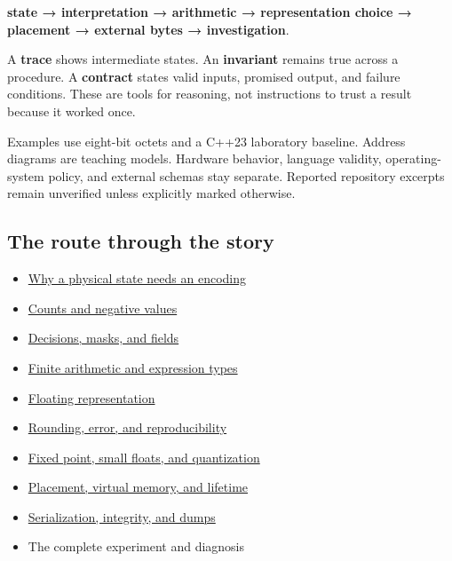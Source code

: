 \textbf{state → interpretation → arithmetic → representation choice → placement → external bytes → investigation}.

A \textbf{trace} shows intermediate states. An \textbf{invariant} remains true across a procedure. A \textbf{contract} states valid inputs, promised output, and failure conditions. These are tools for reasoning, not instructions to trust a result because it worked once.

Examples use eight-bit octets and a C++23 laboratory baseline. Address diagrams are teaching models. Hardware behavior, language validity, operating-system policy, and external schemas stay separate. Reported repository excerpts remain unverified unless explicitly marked otherwise.

\subsection{The route through the story}\label{05-engine-i-ch001-the-route-through-the-story}

\begin{itemize}
\tightlist
\item
  \hyperref[05-engine-i-ch001-prologue---how-a-physical-state-became-a-byte]{Why a physical state needs an encoding}
\item
  \hyperref[05-engine-i-ch001-from-a-signal-to-an-interpretation]{Counts and negative values}
\item
  \hyperref[05-engine-i-ch001-bits-become-decisions-and-compact-fields]{Decisions, masks, and fields}
\item
  \hyperref[05-engine-i-ch001-arithmetic-becomes-a-policy]{Finite arithmetic and expression types}
\item
  \hyperref[05-engine-i-ch001-a-stretching-ruler-for-real-valued-quantities]{Floating representation}
\item
  \hyperref[05-engine-i-ch001-when-arithmetic-meets-uncertainty]{Rounding, error, and reproducibility}
\item
  \hyperref[05-engine-i-ch001-choosing-what-information-to-keep]{Fixed point, small floats, and quantization}
\item
  \hyperref[05-engine-i-ch002-where-the-bytes-live]{Placement, virtual memory, and lifetime}
\item
  \hyperref[05-engine-i-ch002-bytes-become-a-durable-agreement]{Serialization, integrity, and dumps}
\item
  {The complete experiment and diagnosis}
\end{itemize}

